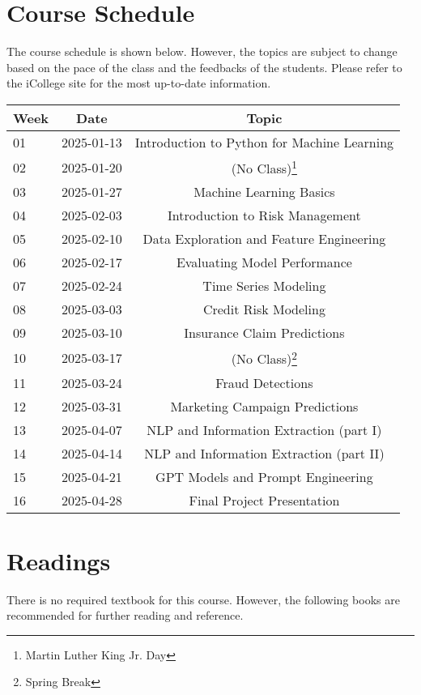 \documentclass[a4paper, 12pt]{article}
\begin{document}
\section{Course Schedule}
The course schedule is shown below. However, the topics are subject to change based on the pace of the class and the feedbacks of the students. Please refer to the iCollege site for the most up-to-date information.

\begin{center}
    \begin{tabular}{ l | c | c }
        \hline			
        Week & Date & Topic\\
        \hline
        01 & 2025-01-13 & Introduction to Python for Machine Learning\\
        02 & 2025-01-20 & (No Class)\footnote{Martin Luther King Jr. Day}\\
        03 & 2025-01-27 & Machine Learning Basics\\
        04 & 2025-02-03 & Introduction to Risk Management\\
        05 & 2025-02-10 & Data Exploration and Feature Engineering\\
        06 & 2025-02-17 & Evaluating Model Performance\\
        07 & 2025-02-24 & Time Series Modeling\\
        08 & 2025-03-03 & Credit Risk Modeling\\
        09 & 2025-03-10 & Insurance Claim Predictions\\
        10 & 2025-03-17 & (No Class)\footnote{Spring Break}\\
        11 & 2025-03-24 & Fraud Detections\\
        12 & 2025-03-31 & Marketing Campaign Predictions\\
        13 & 2025-04-07 & NLP and Information Extraction (part I)\\
        14 & 2025-04-14 & NLP and Information Extraction (part II)\\
        15 & 2025-04-21 & GPT Models and Prompt Engineering\\
        16 & 2025-04-28 & Final Project Presentation\\
        \hline  
    \end{tabular}
\end{center}

\section{Readings}
There is no required textbook for this course. However, the following books are recommended for further reading and reference.
\end{document}
